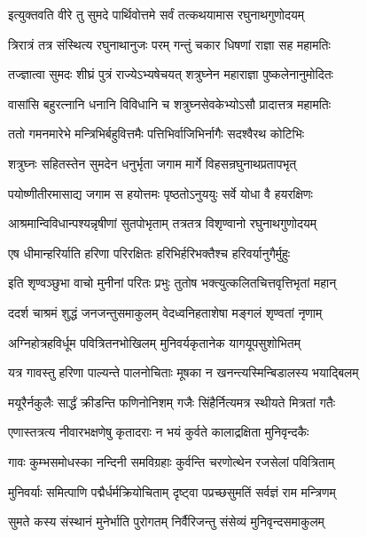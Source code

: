 \twolineshloka
{इत्युक्तवति वीरे तु सुमदे पार्थिवोत्तमे}
{सर्वं तत्कथयामास रघुनाथगुणोदयम्}%

\twolineshloka
{त्रिरात्रं तत्र संस्थित्य रघुनाथानुजः परम्}
{गन्तुं चकार धिषणां राज्ञा सह महामतिः}%

\twolineshloka
{तज्ज्ञात्वा सुमदः शीघ्रं पुत्रं राज्येऽभ्यषेचयत्}
{शत्रुघ्नेन महाराज्ञा पुष्कलेनानुमोदितः}%

\twolineshloka
{वासांसि बहुरत्नानि धनानि विविधानि च}
{शत्रुघ्नसेवकेभ्योऽसौ प्रादात्तत्र महामतिः}%

\twolineshloka
{ततो गमनमारेभे मन्त्रिभिर्बहुवित्तमैः}
{पत्तिभिर्वाजिभिर्नागैः सदश्वैरथ कोटिभिः}%

\twolineshloka
{शत्रुघ्नः सहितस्तेन सुमदेन धनुर्भृता}
{जगाम मार्गे विहसन्रघुनाथप्रतापभृत्}%

\twolineshloka
{पयोष्णीतीरमासाद्य जगाम स हयोत्तमः}
{पृष्ठतोऽनुययुः सर्वे योधा वै हयरक्षिणः}%

\twolineshloka
{आश्रमान्विविधान्पश्यन्नृषीणां सुतपोभृताम्}
{तत्रतत्र विशृण्वानो रघुनाथगुणोदयम्}%

\twolineshloka
{एष धीमान्हरिर्याति हरिणा परिरक्षितः}
{हरिभिर्हरिभक्तैश्च हरिवर्यानुगैर्मुहुः}%

\twolineshloka
{इति शृण्वञ्छुभा वाचो मुनीनां परितः प्रभुः}
{तुतोष भक्त्युत्कलितचित्तवृत्तिभृतां महान्}%

\twolineshloka
{ददर्श चाश्रमं शुद्धं जनजन्तुसमाकुलम्}
{वेदध्वनिहताशेषा मङ्गलं शृण्वतां नृणाम्}%

\twolineshloka
{अग्निहोत्रहविर्धूम पवित्रितनभोखिलम्}
{मुनिवर्यकृतानेक यागयूपसुशोभितम्}%

\twolineshloka
{यत्र गावस्तु हरिणा पाल्यन्ते पालनोचिताः}
{मूषका न खनन्त्यस्मिन्बिडालस्य भयाद्बिलम्}%

\twolineshloka
{मयूरैर्नकुलैः सार्द्धं क्रीडन्ति फणिनोनिशम्}
{गजैः सिंहैर्नित्यमत्र स्थीयते मित्रतां गतैः}%

\twolineshloka
{एणास्तत्रत्य नीवारभक्षणेषु कृतादराः}
{न भयं कुर्वते कालाद्रक्षिता मुनिवृन्दकैः}%

\twolineshloka
{गावः कुम्भसमोधस्का नन्दिनी समविग्रहाः}
{कुर्वन्ति चरणोत्थेन रजसेलां पवित्रिताम्}%

\twolineshloka
{मुनिवर्याः समित्पाणि पद्मैर्धर्मक्रियोचिताम्}
{दृष्ट्वा पप्रच्छसुमतिं सर्वज्ञं राम मन्त्रिणम्}%


\twolineshloka
{सुमते कस्य संस्थानं मुनेर्भाति पुरोगतम्}
{निर्वैरिजन्तु संसेव्यं मुनिवृन्दसमाकुलम्}%


